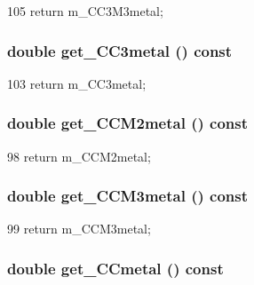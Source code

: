 \begin{DoxyCode}
105 { return m_CC3M3metal; }
\end{DoxyCode}
\hypertarget{classTechParameter_a3d8b84f46e39b9dd770c3288aa1ee94b}{
\subsubsection[{get\_\-CC3metal}]{\setlength{\rightskip}{0pt plus 5cm}double get\_\-CC3metal () const}}
\label{classTechParameter_a3d8b84f46e39b9dd770c3288aa1ee94b}



\begin{DoxyCode}
103 { return m_CC3metal; }
\end{DoxyCode}
\hypertarget{classTechParameter_a65726505c9313832b3717bdda41ba73b}{
\subsubsection[{get\_\-CCM2metal}]{\setlength{\rightskip}{0pt plus 5cm}double get\_\-CCM2metal () const}}
\label{classTechParameter_a65726505c9313832b3717bdda41ba73b}



\begin{DoxyCode}
98 { return m_CCM2metal; }
\end{DoxyCode}
\hypertarget{classTechParameter_a1e2db506b866ee12fd2542fcb1381593}{
\subsubsection[{get\_\-CCM3metal}]{\setlength{\rightskip}{0pt plus 5cm}double get\_\-CCM3metal () const}}
\label{classTechParameter_a1e2db506b866ee12fd2542fcb1381593}



\begin{DoxyCode}
99 { return m_CCM3metal; }
\end{DoxyCode}
\hypertarget{classTechParameter_a6c2db5ec524a7f29a81f535845198e38}{
\subsubsection[{get\_\-CCmetal}]{\setlength{\rightskip}{0pt plus 5cm}double get\_\-CCmetal () const}}
\label{classTechParameter_a6c2db5ec524a7f29a81f535845198e38}



